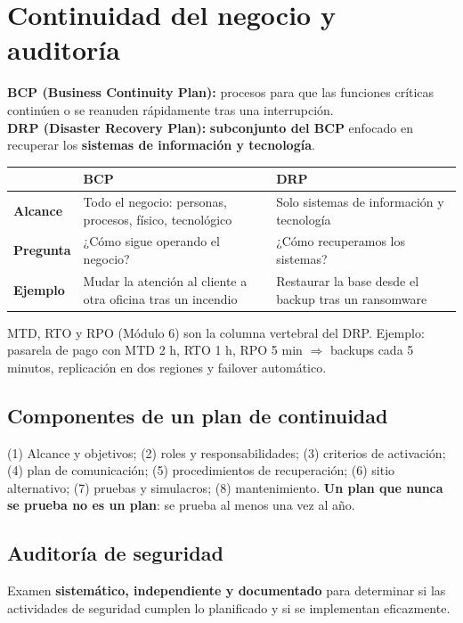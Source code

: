 \documentclass[12pt,a4paper]{article}
\begin{document}
\section{Continuidad del negocio y auditor\'ia}

\begin{cajaDefinicion}
\textbf{BCP (Business Continuity Plan):} procesos para que las funciones cr\'iticas
contin\'uen o se reanuden r\'apidamente tras una interrupci\'on.\\
\textbf{DRP (Disaster Recovery Plan):} \textbf{subconjunto del BCP} enfocado en
recuperar los \textbf{sistemas de informaci\'on y tecnolog\'ia}.
\end{cajaDefinicion}

\begin{tabularx}{\textwidth}{|>{\bfseries}p{2.6cm}|X|X|}
\hline
\rowcolor{grisClaro}
 & BCP & DRP \\
\hline
Alcance & Todo el negocio: personas, procesos, f\'isico, tecnol\'ogico & Solo sistemas de informaci\'on y tecnolog\'ia \\
\hline
Pregunta & ¿C\'omo sigue operando el negocio? & ¿C\'omo recuperamos los sistemas? \\
\hline
Ejemplo & Mudar la atenci\'on al cliente a otra oficina tras un incendio & Restaurar la base desde el backup tras un ransomware \\
\hline
\end{tabularx}

MTD, RTO y RPO (M\'odulo 6) son la columna vertebral del DRP. Ejemplo: pasarela de
pago con MTD 2 h, RTO 1 h, RPO 5 min $\Rightarrow$ backups cada 5 minutos,
replicaci\'on en dos regiones y failover autom\'atico.

\subsection{Componentes de un plan de continuidad}
(1) Alcance y objetivos; (2) roles y responsabilidades; (3) criterios de activaci\'on;
(4) plan de comunicaci\'on; (5) procedimientos de recuperaci\'on; (6) sitio
alternativo; (7) pruebas y simulacros; (8) mantenimiento. \textbf{Un plan que nunca se
prueba no es un plan}: se prueba al menos una vez al a\~no.

\subsection{Auditor\'ia de seguridad}
\begin{cajaDefinicion}
Examen \textbf{sistem\'atico, independiente y documentado} para determinar si las
actividades de seguridad cumplen lo planificado y si se implementan eficazmente.
\end{cajaDefinicion}
\end{document}
